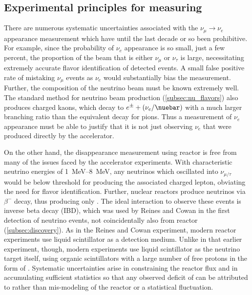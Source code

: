 \subsection{Experimental principles for measuring \texorpdfstring{\thetaot}{theta13}}
\label{subsec:theta13_experiments}
There are numerous systematic uncertainties associated with the $\nu_\mu\to\nu_e$ appearance measurement
which have until the last decade or so been prohibitive.
For example, since the probability of $\nu_e$ appearance is so small,
just a few percent,
the proportion of the beam that is either $\nu_\mu$ or $\nu_\tau$ is large,
necessitating extremely accurate flavor identification of detected events.
A small false positive rate of mistaking $\nu_\mu$ events as $\nu_e$
would substantially bias the measurement.
Further, the composition of the neutrino beam must be known extremely well.
The standard method for neutrino beam production (\cref{subsec:nu_flavors})
also produces charged kaons, which decay to $e^\pm + (\nu_e/\nuebar)$
with a much larger branching ratio than the equivalent decay for pions.
Thus a measurement of $\nu_e$ appearance must be able to justify
that it is not just observing $\nu_e$ that were produced directly
by the accelerator.

On the other hand, the disappearance measurement using reactor \nuebar{} is
free from many of the issues faced by the accelerator experiments.
With characteristic neutrino energies of \SIrange{1}{8}{\MeV},
any neutrinos which oscillated into $\nu_{\mu/\tau}$
would be below threshold for producing the associated charged lepton,
obviating the need for flavor identification.
Further, nuclear reactors produce neutrinos via $\beta^-$ decay,
thus producing only \nuebar{}.
The ideal interaction to observe these \nuebar{} events
is inverse beta decay (IBD),
which was used by Reines and Cowan in the first detection of neutrino events,
not coincidentally also from reactor \nuebar{} (\cref{subsec:discovery}).
As in the Reines and Cowan experiment,
modern reactor \nuebar{} experiments use liquid scintillator
as a detection medium.
Unlike in that earlier experiment, though,
modern experiments use liquid scintillator as the neutrino target itself,
using organic scintillators with a large number of free protons
in the form of .
Systematic uncertainties arise in constraining the reactor \nuebar{} flux
and in accumulating sufficient statistics
so that any observed deficit of \nuebar{}
can be attributed to \thetaot{} rather than mis-modeling of the reactor
or a statistical fluctuation.

